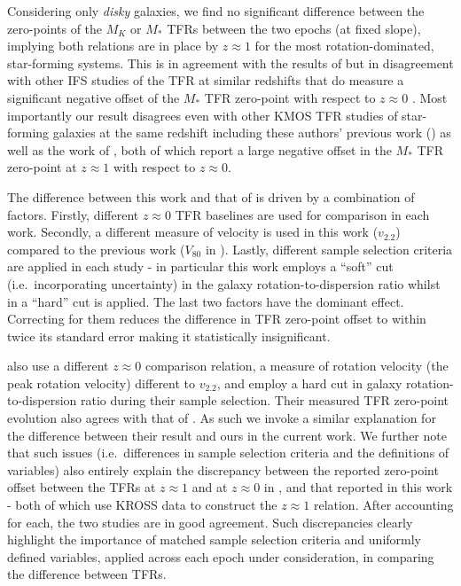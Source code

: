 \documentclass[a4paper,fleqn,usenatbib]{mnras}
\begin{document}
{Considering only \textit{disky} galaxies, we find no significant difference between the zero-points of the $M_{K}$ or $M_{*}$ TFRs between the two epochs (at fixed slope), implying both relations are in place by $z\approx1$ for the most rotation-dominated, star-forming systems. This is in agreement with the results of \citet{Miller:2011,Miller:2012} but in disagreement with other IFS studies of the TFR at similar redshifts that do measure a significant negative offset of the $M_{*}$ TFR zero-point with respect to $z\approx0$ \citep[e.g.][]{Puech:2008}. Most importantly our result disagrees even with other KMOS TFR studies of star-forming galaxies at the same redshift including these authors' previous work (\citet{Tiley:2016}) as well as the work of \citet{Ubler:2017}, both of which report a large negative offset in the $M_{*}$ TFR zero-point at $z\approx1$ with respect to $z\approx0$.

The difference between this work and that of \citet{Tiley:2016} is driven by a combination of factors. Firstly, different $z\approx0$ TFR baselines are used for comparison in each work. Secondly, a different measure of velocity is used in this work ($v_{2.2}$) compared to the previous work ($V_{80}$ in \citealt{Tiley:2016}). Lastly, different sample selection criteria are applied in each study - in particular this work employs a ``soft'' cut (i.e.\ incorporating uncertainty) in the galaxy rotation-to-dispersion ratio whilst in \citet{Tiley:2016} a ``hard'' cut is applied. The last two factors have the dominant effect. Correcting for them reduces the difference in TFR zero-point offset to within twice its standard error making it statistically insignificant. 

\citet{Ubler:2017} also use a different $z\approx0$ comparison relation, a measure of rotation velocity (the peak rotation velocity) different to $v_{2.2}$, and employ a hard cut in galaxy rotation-to-dispersion ratio during their sample selection. Their measured TFR zero-point evolution also agrees with that of \citet{Tiley:2016}. As such we invoke a similar explanation for the difference between their result and ours in the current work. We further note that such issues (i.e.\ differences in sample selection criteria and the definitions of variables) also entirely explain the discrepancy between the reported zero-point offset between the TFRs at $z\approx1$ and at $z\approx0$ in \citet{Turner:2017b}, and that reported in this work - both of which use KROSS data to construct the $z\approx1$ relation. After accounting for each, the two studies are in good agreement. Such discrepancies clearly highlight the importance of matched sample selection criteria and uniformly defined variables, applied across each epoch under consideration, in comparing the difference between TFRs. 



}
\end{document}

